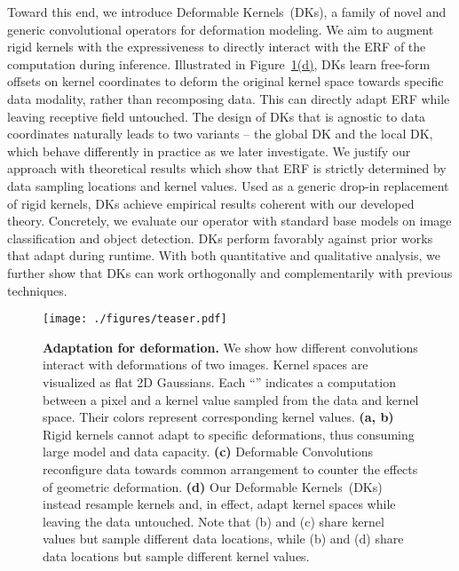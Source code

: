 \documentclass{article} \usepackage{iclr2020_conference, times}
\newcommand{\captiont}[2]{\caption{\textbf{#1} #2}}
\begin{document}
Toward this end, we introduce Deformable Kernels~(DKs), a family of novel and generic
convolutional operators for deformation modeling.
We aim to augment rigid kernels with the expressiveness to directly interact
with the ERF of the computation during inference.
Illustrated in Figure~\hyperref[fig:teaser]{1(d)}, DKs learn free-form offsets
on kernel coordinates to deform the original kernel space towards specific data
modality, rather than recomposing data.
This can directly adapt ERF while leaving receptive field untouched.
The design of DKs that is agnostic to data coordinates naturally
leads to two variants -- the global DK and the local DK, which behave
differently in practice as we later investigate.
We justify our approach with
theoretical results which show that ERF is strictly determined by data sampling locations and
kernel values.
Used as a generic drop-in replacement of rigid kernels, DKs achieve empirical
results coherent with our developed theory.
Concretely, we evaluate our operator with standard base models on
image classification and object detection.
DKs perform favorably against prior works that adapt during runtime.
With both quantitative and qualitative analysis, we further show that DKs can
work orthogonally and complementarily with previous techniques.


\begin{figure}[t]
    \centering
    \texttt{[image: ./figures/teaser.pdf]}
    \captiont{Adaptation for deformation.}{
        We show how different  convolutions interact with deformations of two images.
        Kernel spaces are visualized as flat 2D Gaussians.
        Each ``'' indicates a computation between a pixel and a kernel value
        sampled from the data and kernel space.
        Their colors represent corresponding kernel values.
        \textbf{(a, b)} Rigid kernels cannot adapt to specific deformations,
        thus consuming large model and data capacity.
        \textbf{(c)} Deformable Convolutions~\citep{dai2017deformable} reconfigure
        data towards common arrangement to counter the effects of geometric deformation.
        \textbf{(d)} Our Deformable Kernels~(DKs) instead resample kernels and,
        in effect, adapt kernel spaces while leaving the data untouched.
        Note that (b) and (c) share kernel values but sample different data
        locations, while (b) and (d) share data locations but sample different kernel values.
    }
    \vspace{-0.5em}
    \label{fig:teaser}
\end{figure}
\end{document}
